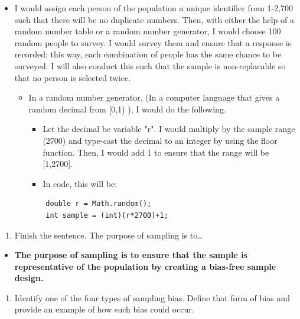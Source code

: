 \documentclass[letterpaper]{article}
\def\tightlist{}
\begin{document}
\begin{itemize}
\tightlist
\item
  I would assign each person of the population a unique identifier from 1-2,700 such that there will be no duplicate numbers. Then, with either the help of a random number table or a random number generator, I would choose 100 random people to survey. I would survey them and ensure that a response is recorded; this way, each combination of people has the same chance to be surveyed. I will also conduct this such that the sample is non-replacable so that no person is selected twice.

  \begin{itemize}
  \tightlist
  \item
    In a random number generator, (In a computer language that gives a random decimal from {[}0,1) ), I would do the following.

    \begin{itemize}
    \tightlist
    \item
      Let the decimal be variable "r". I would multiply by the sample range (2700) and type-cast the decimal to an integer by using the floor function. Then, I would add 1 to ensure that the range will be {[}1,2700{]}.
    \item
      In code, this will be:
    \end{itemize}

\begin{verbatim}
    double r = Math.random();
    int sample = (int)(r*2700)+1;
\end{verbatim}
  \end{itemize}
\end{itemize}

\begin{enumerate}
\def\labelenumi{(\alph{enumi})}
\setcounter{enumi}{2}
\tightlist
\item
  Finish the sentence. The purpose of sampling is to\ldots{}
\end{enumerate}

\begin{itemize}
\tightlist
\item
  \textbf{The purpose of sampling is to ensure that the sample is representative of the population by creating a bias-free sample design.}
\end{itemize}

\begin{enumerate}
\def\labelenumi{(\alph{enumi})}
\setcounter{enumi}{3}
\tightlist
\item
  Identify one of the four types of sampling bias. Define that form of bias and provide an example of how such bias could occur.
\end{enumerate}
\end{document}
